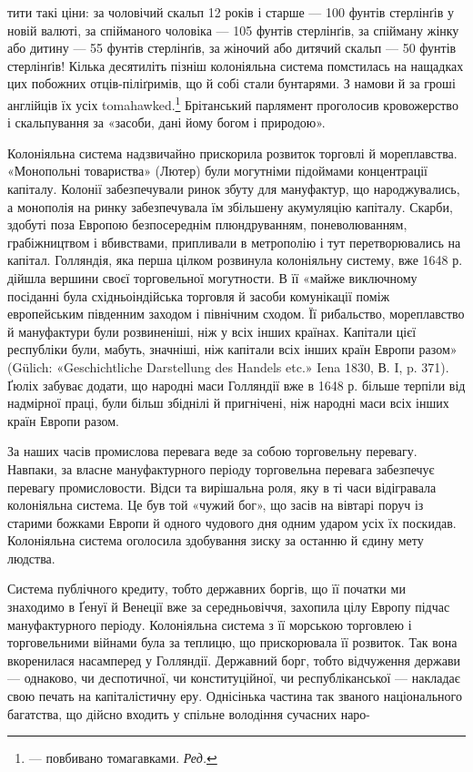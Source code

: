 тити такі ціни: за чоловічий скальп 12 років і старше — 100 фунтів стерлінґів у новій валюті, за
спійманого чоловіка — 105 фунтів стерлінґів, за спійману жінку або дитину — 55 фунтів стерлінґів, за
жіночий або дитячий скальп — 50 фунтів стерлінґів!
Кілька десятиліть пізніш колоніяльна система помстилась на нащадках цих побожних отців-піліґримів,
що й собі стали бунтарями. З намови й за гроші англійців їх усіх tomahawked.\footnote*{
— повбивано томагавками. \emph{Ред.}
} Брітанський парлямент
проголосив кровожерство і скальпування
за «засоби, дані йому богом і природою».

Колоніяльна система надзвичайно прискорила розвиток торговлі й мореплавства. «Монопольні товариства»
(Лютер) були могутніми підоймами концентрації капіталу. Колонії забезпечували ринок збуту для
мануфактур, що народжувались, а монополія на ринку забезпечувала їм збільшену акумуляцію капіталу.
Скарби, здобуті поза Европою безпосереднім плюндруванням, поневолюванням, грабіжництвом і
вбивствами, припливали в метрополію і тут перетворювались на капітал. Голляндія, яка перша цілком
розвинула колоніяльну систему, вже 1648 р. дійшла вершини своєї торговельної могутности. В її «майже
виключному посіданні була східньоіндійська торговля й засоби
комунікації поміж европейським південним заходом і північним сходом. Її рибальство, мореплавство й
мануфактури були розвиненіші, ніж у всіх інших країнах. Капітали цієї республіки були, мабуть,
значніші, ніж капітали всіх інших країн Европи разом» (Gülich: «Geschichtliche Darstellung des
Handels etc.» Iena 1830, В. I, p. 371). Ґюліх забуває додати, що народні маси Голляндії вже в 1648
р. більше терпіли від надмірної праці, були більш збіднілі й пригнічені, ніж народні маси всіх інших
країн Европи разом.

За наших часів промислова перевага веде за собою торговельну перевагу. Навпаки, за власне
мануфактурного періоду торговельна перевага забезпечує перевагу промисловости. Відси та вирішальна
роля, яку в ті часи відігравала колоніяльна система. Це був той «чужий бог», що засів на вівтарі
поруч із старими божками Европи й одного чудового дня одним ударом усіх їх поскидав. Колоніяльна
система оголосила здобування зиску за останню й єдину мету людства.

Система публічного кредиту, тобто державних боргів, що її початки ми знаходимо в Ґенуї й Венеції вже
за середньовіччя, захопила цілу Европу підчас мануфактурного періоду. Колоніяльна система з її
морською торговлею і торговельними війнами була за теплицю, що прискорювала її розвиток. Так вона
вкоренилася насамперед у Голляндії. Державний борг, тобто відчуження держави — однаково, чи
деспотичної, чи конституційної, чи республіканської — накладає свою печать на капіталістичну еру.
Однісінька частина так званого національного багатства, що дійсно входить у спільне володіння
сучасних наро-